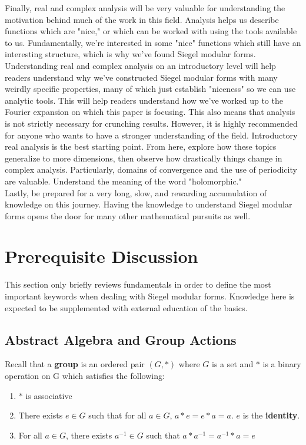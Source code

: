 \documentclass[11pt, oneside]{amsart}
\begin{document}
Finally, real and complex analysis will be very valuable for understanding the motivation behind much of the work in this field. Analysis helps us describe functions which are "nice," or which can be worked with using the tools available to us. Fundamentally, we're interested in some "nice" functions which still have an interesting structure, which is why we've found Siegel modular forms. Understanding real and complex analysis on an introductory level will help readers understand why we've constructed Siegel modular forms with many weirdly specific properties, many of which just establish "niceness" so we can use analytic tools. This will help readers understand how we've worked up to the Fourier expansion on which this paper is focusing. This also means that analysis is not strictly necessary for crunching results. However, it is highly recommended for anyone who wants to have a stronger understanding of the field. Introductory real analysis is the best starting point. From here, explore how these topics generalize to more dimensions, then observe how drastically things change in complex analysis. Particularly, domains of convergence and the use of periodicity are valuable. Understand the meaning of the word "holomorphic."\\
Lastly, be prepared for a very long, slow, and rewarding accumulation of knowledge on this journey. Having the knowledge to understand Siegel modular forms opens the door for many other mathematical pursuits as well.
\section{Prerequisite Discussion}
This section only briefly reviews fundamentals in order to define the most important keywords when dealing with Siegel modular forms. Knowledge here is expected to be supplemented with external education of the basics.
\subsection{Abstract Algebra and Group Actions}
Recall that a \textbf{group} is an ordered pair $(G, *)$ where $G$ is a set and $*$ is a binary operation on G which satisfies the following:
\begin{enumerate}
\item $*$ is associative
\item There exists $e\in G$ such that for all $a\in G$, $a*e=e*a=a$. $e$ is the \textbf{identity}.
\item For all $a\in G$, there exists $a^{-1}\in G$ such that $a*a^{-1}=a^{-1}*a=e$
\end{enumerate}
\end{document}
